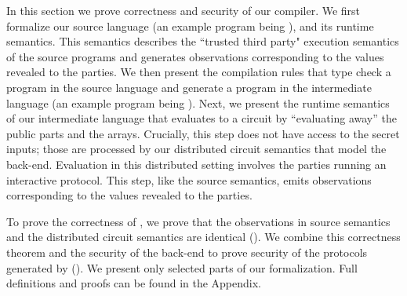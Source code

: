 In this section we prove correctness and security of our \tool compiler.
We first formalize our source language (an example program being
), and its runtime semantics.
This semantics describes the ``trusted third party"
execution semantics of the source programs and
generates observations corresponding to the values revealed to the
parties.
%
We then present the compilation rules that type check a program in the
source language and generate a program in the intermediate
language (an example program being ).
%
Next, we present the runtime semantics of our intermediate language
that evaluates to a circuit by ``evaluating away'' the public parts
and the arrays. Crucially, this step does not have access to the secret
inputs; those are processed by our distributed circuit semantics that
model the \mpc back-end.
%
Evaluation in this distributed setting involves the parties running an
interactive protocol. This step, like  the source semantics, emits
observations corresponding to the values revealed to the parties.

To prove the correctness of \tool, we prove that  the observations in
source semantics and the distributed circuit semantics are identical
().
We combine this correctness theorem and the security of the \mpc
back-end to prove security of the protocols generated by \tool
().
We present only selected parts of our formalization. Full definitions
and proofs can be found in the Appendix.



